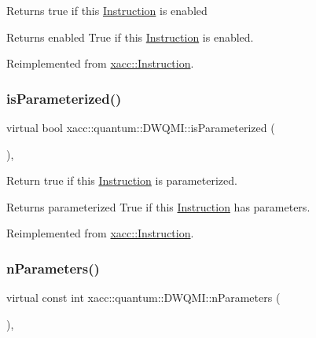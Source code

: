 Returns true if this \hyperlink{a01155}{Instruction} is enabled

\begin{DoxyReturn}{Returns}
enabled True if this \hyperlink{a01155}{Instruction} is enabled. 
\end{DoxyReturn}


Reimplemented from \hyperlink{a01155_ad02a1cf7220577124720b7a51424cea7}{xacc\+::\+Instruction}.

\mbox{\label{a00987_aee43b2e499f122dfe250b529a3f77add}} 
\subsubsection{\texorpdfstring{is\+Parameterized()}{isParameterized()}}
{\footnotesize\ttfamily virtual bool xacc\+::quantum\+::\+D\+W\+Q\+M\+I\+::is\+Parameterized (\begin{DoxyParamCaption}{ }\end{DoxyParamCaption})\hspace{0.3cm}{\ttfamily [inline]}, {\ttfamily [virtual]}}

Return true if this \hyperlink{a01155}{Instruction} is parameterized.

\begin{DoxyReturn}{Returns}
parameterized True if this \hyperlink{a01155}{Instruction} has parameters. 
\end{DoxyReturn}


Reimplemented from \hyperlink{a01155_a7b24d8ae485369fc2b2df7a3224a5e26}{xacc\+::\+Instruction}.

\mbox{\label{a00987_afdfc8b852ba29c2b21c5c368098ffc4c}} 
\subsubsection{\texorpdfstring{n\+Parameters()}{nParameters()}}
{\footnotesize\ttfamily virtual const int xacc\+::quantum\+::\+D\+W\+Q\+M\+I\+::n\+Parameters (\begin{DoxyParamCaption}{ }\end{DoxyParamCaption})\hspace{0.3cm}{\ttfamily [inline]}, {\ttfamily [virtual]}}

